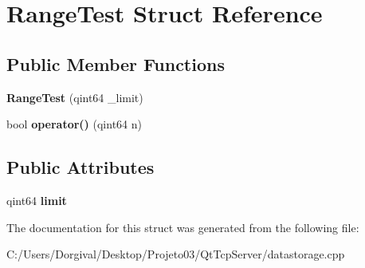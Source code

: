 \section{Range\+Test Struct Reference}
\label{struct_range_test}
\subsection*{Public Member Functions}
\begin{DoxyCompactItemize}
\item 
\mbox{\label{struct_range_test_a9d96f82c111ffd4d2747416b90306791}} 
{\bfseries Range\+Test} (qint64 \+\_\+limit)
\item 
\mbox{\label{struct_range_test_add496768a566e04219e840ee25e829d7}} 
bool {\bfseries operator()} (qint64 n)
\end{DoxyCompactItemize}
\subsection*{Public Attributes}
\begin{DoxyCompactItemize}
\item 
\mbox{\label{struct_range_test_a638ebd61c0447db219f10cd1473ab364}} 
qint64 {\bfseries limit}
\end{DoxyCompactItemize}


The documentation for this struct was generated from the following file\+:\begin{DoxyCompactItemize}
\item 
C\+:/\+Users/\+Dorgival/\+Desktop/\+Projeto03/\+Qt\+Tcp\+Server/datastorage.\+cpp\end{DoxyCompactItemize}
